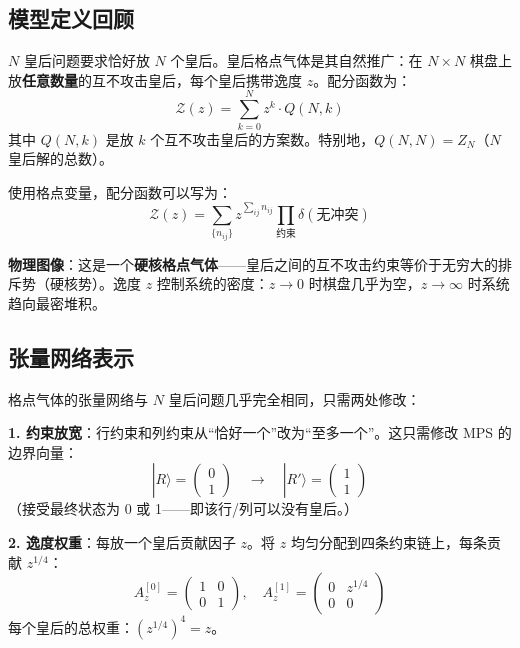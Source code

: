 \documentclass[12pt,a4paper]{ctexart}
\begin{document}
\subsection{模型定义回顾}

$N$ 皇后问题要求恰好放 $N$ 个皇后。皇后格点气体是其自然推广：在 $N \times N$ 棋盘上放\textbf{任意数量}的互不攻击皇后，每个皇后携带逸度 $z$。配分函数为：
\begin{equation}
\boxed{\mathcal{Z}(z) = \sum_{k=0}^{N} z^k \cdot Q(N, k)}
\end{equation}
其中 $Q(N, k)$ 是放 $k$ 个互不攻击皇后的方案数。特别地，$Q(N, N) = Z_N$（$N$ 皇后解的总数）。

使用格点变量，配分函数可以写为：
\begin{equation}
\mathcal{Z}(z) = \sum_{\{n_{ij}\}} z^{\sum_{ij} n_{ij}} \prod_{\text{约束}} \delta(\text{无冲突})
\end{equation}

\textbf{物理图像}：这是一个\textbf{硬核格点气体}——皇后之间的互不攻击约束等价于无穷大的排斥势（硬核势）。逸度 $z$ 控制系统的密度：$z \to 0$ 时棋盘几乎为空，$z \to \infty$ 时系统趋向最密堆积。

\subsection{张量网络表示}

格点气体的张量网络与 $N$ 皇后问题几乎完全相同，只需两处修改：

\textbf{1. 约束放宽}：行约束和列约束从``恰好一个''改为``至多一个''。这只需修改 MPS 的边界向量：
\begin{equation}
|R\rangle = \begin{pmatrix} 0 \\ 1 \end{pmatrix} \quad \longrightarrow \quad |R'\rangle = \begin{pmatrix} 1 \\ 1 \end{pmatrix}
\end{equation}
（接受最终状态为 0 或 1——即该行/列可以没有皇后。）

\textbf{2. 逸度权重}：每放一个皇后贡献因子 $z$。将 $z$ 均匀分配到四条约束链上，每条贡献 $z^{1/4}$：
\begin{equation}
A_z^{[0]} = \begin{pmatrix} 1 & 0 \\ 0 & 1 \end{pmatrix}, \quad
A_z^{[1]} = \begin{pmatrix} 0 & z^{1/4} \\ 0 & 0 \end{pmatrix}
\end{equation}
每个皇后的总权重：$(z^{1/4})^4 = z$。
\end{document}
